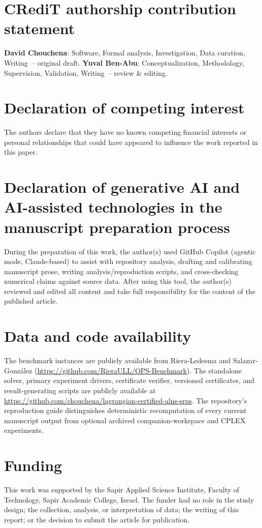 \documentclass[preprint,12pt]{elsarticle}
\begin{document}
\section*{CRediT authorship contribution statement}
\textbf{David Chouchena}: Software, Formal analysis, Investigation, Data curation, Writing~-- original draft.
\textbf{Yuval Ben-Abu}: Conceptualization, Methodology, Supervision, Validation, Writing~-- review \& editing.

\section*{Declaration of competing interest}
The authors declare that they have no known competing financial interests or personal relationships that could have appeared to influence the work reported in this paper.

\section*{Declaration of generative AI and AI-assisted technologies in the manuscript preparation process}
During the preparation of this work, the author(s) used GitHub Copilot (agentic mode, Claude-based) to assist with repository analysis, drafting and calibrating manuscript prose, writing analysis/reproduction scripts, and cross-checking numerical claims against source data. After using this tool, the author(s) reviewed and edited all content and take full responsibility for the content of the published article.

\section*{Data and code availability}
The benchmark instances are publicly available from Riera-Ledesma and Salazar-Gonz\'alez \cite{RieraLedesma2021SRPS} (\url{https://github.com/RieraULL/OPS-Benchmark}). The standalone solver, primary experiment drivers, certificate verifier, versioned certificates, and result-generating scripts are publicly available at
\url{https://github.com/chouchena/lagrangian-certified-alns-srps}. The repository's reproduction guide distinguishes deterministic recomputation of every current manuscript output from optional archived companion-workspace and CPLEX experiments.

\section*{Funding}
This work was supported by the Sapir Applied Science Institute, Faculty of Technology, Sapir Academic College, Israel. The funder had no role in the study design; the collection, analysis, or interpretation of data; the writing of this report; or the decision to submit the article for publication.
\end{document}
